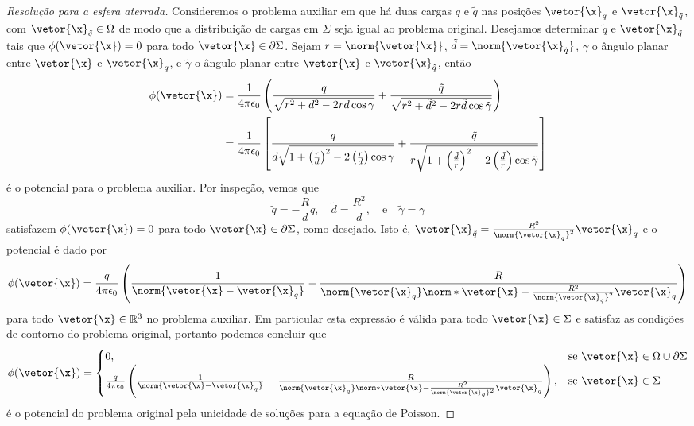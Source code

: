 \begin{proof}[Resolução para a esfera aterrada]
    Consideremos o problema auxiliar em que há duas cargas \(q\) e \(\tilde{q}\) nas posições \(\vetor{\x}_q\) e \(\vetor{\x}_{\tilde{q}}\), com \(\vetor{\x}_{\tilde{q}} \in \Omega\) de modo que a distribuição de cargas em \(\Sigma\) seja igual ao problema original. Desejamos determinar \(\tilde{q}\) e \(\vetor{\x}_{\tilde{q}}\) tais que \(\phi(\vetor{\x}) = 0\) para todo \(\vetor{\x} \in \partial \Sigma\). Sejam \(r = \norm{\vetor{\x}}\), \(\tilde{d} = \norm{\vetor{\x}_{\tilde{q}}}\), \(\gamma\) o ângulo planar entre \(\vetor{\x}\) e \(\vetor{\x}_q\), e \(\tilde{\gamma}\) o ângulo planar entre \(\vetor{\x}\) e \(\vetor{\x}_{\tilde{q}}\), então
    \begin{align*}
        \phi(\vetor{\x}) &= \frac{1}{4\pi \epsilon_0} \left(\frac{q}{\sqrt{r^2 + d^2 - 2rd \cos \gamma}} + \frac{\tilde{q}}{\sqrt{r^2 + \tilde{d}^2 - 2r\tilde{d} \cos\tilde{\gamma}}}\right)\\
                         &= \frac{1}{4\pi \epsilon_0} \left[\frac{q}{d\sqrt{1 + \left(\frac{r}{d}\right)^2 - 2 \left(\frac{r}{d}\right)\cos \gamma}} + \frac{\tilde{q}}{r\sqrt{1 + \left(\frac{\tilde{d}}{r}\right)^2 - 2 \left(\frac{\tilde{d}}{r}\right)\cos\tilde{\gamma}}}\right]
    \end{align*}
    é o potencial para o problema auxiliar. Por inspeção, vemos que
    \begin{equation*}
        \tilde{q} = - \frac{R}{d}q,
        \quad
        \tilde{d} = \frac{R^2}{d},
        \quad\text{e}\quad
        \tilde{\gamma} = \gamma
    \end{equation*}
    satisfazem \(\phi(\vetor{\x}) = 0\) para todo \(\vetor{\x} \in \partial \Sigma\), como desejado. Isto é, \(\vetor{\x}_{\tilde{q}} = \frac{R^2}{\norm{\vetor{\x}_q}^2}\vetor{\x}_q\) e o potencial é dado por
    \begin{equation*}
        \phi(\vetor{\x}) = \frac{q}{4\pi \epsilon_0} \left(\frac{1}{\norm{\vetor{\x} - \vetor{\x}_q}} - \frac{R}{\norm{\vetor{\x}_q}\norm*{\vetor{\x} - \frac{R^2}{\norm{\vetor{\x}_q}^2}\vetor{\x}_q}}\right)
    \end{equation*}
    para todo \(\vetor{\x} \in \mathbb{R}^3\) no problema auxiliar. Em particular esta expressão é válida para todo \(\vetor{\x} \in \Sigma\) e satisfaz as condições de contorno do problema original, portanto podemos concluir que
    \begin{equation*}
        \phi(\vetor{\x}) = \begin{cases}
            0, &\text{se } \vetor{\x}\in \Omega \cup \partial \Sigma\\
            \frac{q}{4\pi \epsilon_0} \left(\frac{1}{\norm{\vetor{\x} - \vetor{\x}_q}} - \frac{R}{\norm{\vetor{\x}_q}\norm*{\vetor{\x} - \frac{R^2}{\norm{\vetor{\x}_q}^2}\vetor{\x}_q}}\right),&\text{se }\vetor{\x} \in \Sigma
        \end{cases}
    \end{equation*}
    é o potencial do problema original pela unicidade de soluções para a equação de Poisson.


\end{proof}
